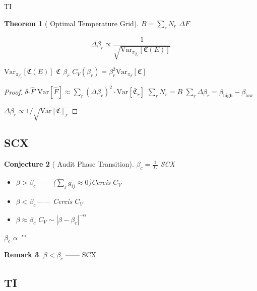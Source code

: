\documentclass[12pt,a4paper]{article}
\theoremstyle{plain}
\newtheorem{theorem}{ Theorem}[section]
\newtheorem{conjecture}[theorem]{ Conjecture}
\theoremstyle{definition}
\newtheorem{remark}[theorem]{ Remark}
\newcommand{\Var}{\mathrm{Var}}
\newcommand{\Cercis}{\mathfrak{C}}
\begin{document}
\subsection{}

 TI 

\begin{theorem}[ Optimal Temperature Grid]
\label{thm:temp_grid}
 $B = \sum_r N_r$  $\Delta F$ 
\emph{} 

\begin{equation}\label{eq:temp_spacing}
    \Delta\beta_r \propto \frac{1}{\sqrt{\Var_{\pi_{\beta_r}}[\Cercis(E)]}}
\end{equation}

 $\Var_{\pi_{\beta_r}}[\Cercis(E)]$  $\Cercis$  $\beta_r$ 
 $C_V(\beta_r) = \beta_r^2 \Var_{\pi_\beta}[\Cercis]$

\end{theorem}

\begin{proof}
 $\delta$-$\hat{F}$ 
$\Var[\hat{F}] \approx \sum_r (\Delta\beta_r)^2 \cdot \Var[\bar{\Cercis}_r]$
 $\sum_r N_r = B$  $\sum_r \Delta\beta_r = \beta_{\text{high}} - \beta_{\text{low}}$

$\Delta\beta_r \propto 1/\sqrt{\Var[\Cercis]_r}$
\end{proof}

\subsection{SCX }

\begin{conjecture}[ Audit Phase Transition]
 $\beta_c = \frac{1}{T_c}$ SCX \textbf{}

\begin{itemize}
    \item $\beta > \beta_c$——
        ($\sum_j g_{ij} \approx 0$)Cercis  $C_V$ 
    \item $\beta < \beta_c$——
        Cercis  $C_V$ 
    \item $\beta \approx \beta_c$ $C_V \sim |\beta - \beta_c|^{-\alpha}$
\end{itemize}

$\beta_c$ 
 $\alpha$ ""
\end{conjecture}

\begin{remark}
$\beta < \beta_c$
——\textbf{}
 SCX \textbf{}
\end{remark}

\subsection{TI }
\end{document}

